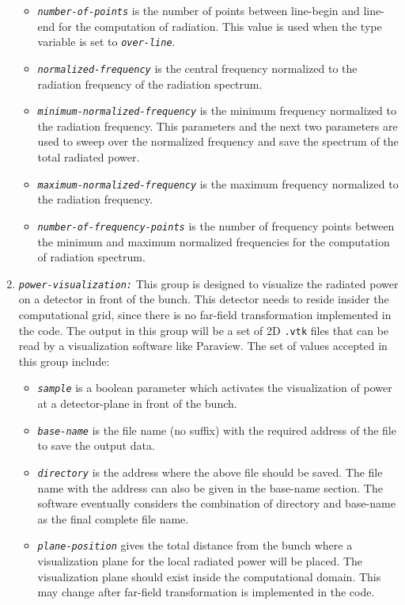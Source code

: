 \begin{enumerate}
\begin{itemize}
	\item {\tt \small \em number-of-points} is the number of points between line-begin and line-end for the computation of radiation. This value is used when the type variable is set to {\tt \small \em over-line}.
	\item {\tt \small \em normalized-frequency} is the central frequency normalized to the radiation frequency of the radiation spectrum.
	\item {\tt \small \em minimum-normalized-frequency} is the minimum frequency normalized to the radiation frequency. This parameters and the next two parameters are used to sweep over the normalized frequency and save the spectrum of the total radiated power.
	\item {\tt \small \em maximum-normalized-frequency} is the maximum frequency normalized to the radiation frequency.
	\item {\tt \small \em number-of-frequency-points} is the number of frequency points between the minimum and maximum normalized frequencies for the computation of radiation spectrum.
\end{itemize}
%
\item {\tt \small \em power-visualization:} This group is designed to visualize the radiated power on a detector in front of the bunch. This detector needs to reside insider the computational grid, since there is no far-field transformation implemented in the code. The output in this group will be a set of 2D {\tt \small .vtk} files that can be read by a visualization software like Paraview.
%
The set of values accepted in this group include:
%
\begin{itemize}
	\item {\tt \small \em sample} is a boolean parameter which activates the visualization of power at a detector-plane in front of the bunch.
	\item {\tt \small \em base-name} is the file name (no suffix) with the required address of the file to save the output data.
	\item {\tt \small \em directory} is the address where the above file should be saved. The file name with the address can also be given in the base-name section. The software eventually considers the combination of directory and base-name as the final complete file name.
	\item {\tt \small \em plane-position} gives the total distance from the bunch where a visualization plane for the local radiated power will be placed. The visualization plane should exist inside the computational domain. This may change after far-field transformation is implemented in the code. 

\end{itemize}
\end{enumerate}
